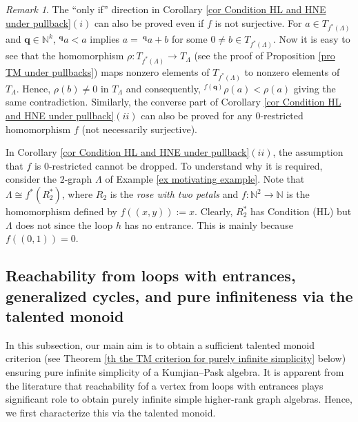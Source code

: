 \documentclass[a4paper,reqno,12pt]{amsart}
\numberwithin{equation}{section}
\theoremstyle{definition}
\theoremstyle{remark}
\newtheorem{rmk}[thm]{Remark}
\newcommand{\Q}{\mathbf{q}}
\begin{document}
\begin{rmk}\label{rem proof holds for any f}
The ``only if'' direction in Corollary \ref{cor Condition HL and HNE under pullback}$(i)$ can also be proved even if $f$ is not surjective. For $a\in T_{f^*(\Lambda)}$ and $\Q\in \mathbb{N}^k$, $^\Q a<a$ implies $a=~^\Q a+b$ for some $0\neq b\in T_{f^*(\Lambda)}$. Now it is easy to see that the homomorphism $\rho:T_{f^*(\Lambda)}\longrightarrow T_\Lambda$ (see the proof of Proposition \ref{pro TM under pullbacks}) maps nonzero elements of $T_{f^*(\Lambda)}$ to nonzero elements of $T_\Lambda$. Hence, $\rho(b)\neq 0$ in $T_\Lambda$ and consequently, $^{f(\Q)}\rho(a)<\rho(a)$ giving the same contradiction. Similarly, the converse part of Corollary \ref{cor Condition HL and HNE under pullback}$(ii)$ can also be proved for any $0$-restricted homomorphism $f$ (not necessarily surjective).     
\end{rmk}
In Corollary \ref{cor Condition HL and HNE under pullback}$(ii)$, the assumption that $f$ is $0$-restricted cannot be dropped. To understand why it is required, consider the $2$-graph $\Lambda$ of Example \ref{ex motivating example}. Note that $\Lambda\cong f^*(R_2^*)$, where $R_2$ is the \emph{rose with two petals} and $f:\mathbb{N}^2\longrightarrow \mathbb{N}$ is the homomorphism defined by $f((x,y)):=x$. Clearly, $R_2^*$ has Condition (HL) but $\Lambda$ does not since the loop $h$ has no entrance. This is mainly because $f((0,1))=0$.

\subsection{Reachability from loops with entrances, generalized cycles, and pure infiniteness via the talented monoid}\label{ssec purely infinite simple}
In this subsection, our main aim is to obtain a sufficient talented monoid criterion (see Theorem \ref{th the TM criterion for purely infinite simplicity} below) ensuring pure infinite simplicity of a Kumjian--Pask algebra. It is apparent from the literature that reachability fof a vertex from loops with entrances plays significant role to obtain purely infinite simple higher-rank graph algebras. Hence, we first characterize this via the talented monoid.
\end{document}
